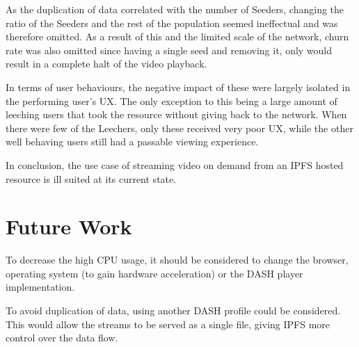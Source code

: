 As the duplication of data correlated with the number of Seeders, changing the ratio of the Seeders and the rest of the population seemed ineffectual and was therefore omitted. As a result of this and the limited scale of the network, churn rate was also omitted since having a single seed and removing it, only would result in a complete halt of the video playback.

In terms of user behaviours, the negative impact of these were largely isolated in the performing user's \ac{UX}. The only exception to this being a large amount of leeching users that took the resource without giving back to the network. When there were few of the Leechers, only these received very poor \ac{UX}, while the other well behaving users still had a passable viewing experience.

In conclusion, the use case of streaming video on demand from an \ac{IPFS} hosted resource is ill suited at its current state.

\section{Future Work}
To decrease the high \ac{CPU} usage, it should be considered to change the browser, operating system (to gain hardware acceleration) or the \ac{DASH} player implementation.

To avoid duplication of data, using another \ac{DASH} profile could be considered. This would allow the streams to be served as a single file, giving \ac{IPFS} more control over the data flow.


